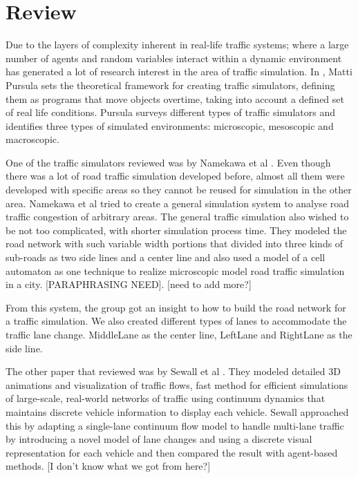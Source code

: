 \documentclass[11pt]{article}
\begin{document}
\section{Review}

Due to the layers of complexity inherent in real-life traffic systems; where a large number of agents and random variables interact within a dynamic environment has generated a lot of research interest in the area of traffic simulation. In \cite{Pursula}, Matti Pursula sets the theoretical framework for creating traffic simulators, defining them as programs that move objects overtime, taking into account a defined set of real life conditions. Pursula surveys different types of traffic simulators and identifies three types of simulated environments: microscopic, mesoscopic and macroscopic.


One of the traffic simulators reviewed was by Namekawa et al \cite{NameUeda05}. Even though there was a lot of road traffic simulation developed before, almost all them were developed with specific areas so they cannot be reused for simulation in the other area. Namekawa et al tried to create a general simulation system to analyse road traffic congestion of arbitrary areas. The general traffic simulation also wished to be not too complicated, with shorter simulation process time. They modeled the road network with such variable width portions that divided into three kinds of sub-roads as two side lines and a center line and also used a model of a cell automaton as one technique to realize microscopic model road traffic simulation in a city. [PARAPHRASING NEED]. [need to add more?]

From this system, the group got an insight to how to build the road network for a traffic simulation.  We also created different types of lanes to accommodate the traffic lane change. MiddleLane as the center line, LeftLane and RightLane as the side line. 

The other paper that reviewed was by Sewall et al \cite{SewWilMer10j}. They modeled detailed 3D animations and visualization of traffic flows, fast method for efficient simulations of large-scale, real-world networks of traffic using continuum dynamics that maintains discrete vehicle information to display each vehicle.
Sewall approached this by adapting a single-lane continuum flow model to handle multi-lane traffic by introducing a novel model of lane changes and using a discrete visual representation for each vehicle and then compared the result with agent-based methods. [I don't know what we got from here?]
\end{document}
